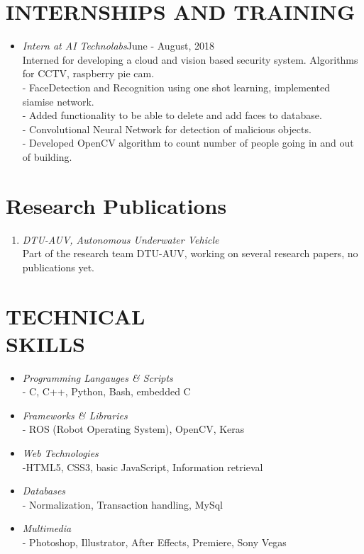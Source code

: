 \documentclass[margin]{res}
\begin{document}
\begin{resume}
\section{INTERNSHIPS AND TRAINING} \begin{itemize}
 \item{\large{\sl Intern at AI Technolabs}}\hfill June - August, 2018 \\
 	Interned for developing a cloud and vision based security system. Algorithms for CCTV, raspberry pie cam.\\
	- FaceDetection and Recognition using one shot learning, implemented siamise network.\\
	- Added functionality to be able to delete and add faces to database.\\
	- Convolutional Neural Network for detection of malicious objects.\\
	- Developed OpenCV algorithm to count number of people going in and out of building.\\
 \end{itemize}

\section{Research Publications}\begin{enumerate}
\item {\sl DTU-AUV, Autonomous Underwater Vehicle  }\\
	Part of the research team DTU-AUV, working on several research papers, no publications yet.

\end{enumerate}

\section{TECHNICAL  \\ SKILLS} \begin{itemize}
\item {\sl Programming Langauges \& Scripts }\\
	- C, C++, Python, Bash,  embedded C
\item {\sl Frameworks \& Libraries}\\
	- ROS (Robot Operating System), OpenCV, Keras
\item {\sl Web Technologies}\\
	 -HTML5, CSS3, basic JavaScript, Information retrieval
 \item{\sl Databases}\\
	- Normalization, Transaction handling, MySql
 \item{\sl Multimedia}\\
	- Photoshop, Illustrator, After Effects, Premiere, Sony Vegas
\end{itemize}


\end{resume}
\end{document}
